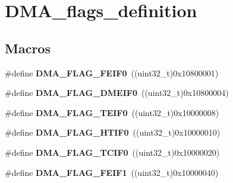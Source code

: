 \hypertarget{group___d_m_a__flags__definition}{\section{D\-M\-A\-\_\-flags\-\_\-definition}
\label{group___d_m_a__flags__definition}
}
\subsection*{Macros}
\begin{DoxyCompactItemize}
\item 
\hypertarget{group___d_m_a__flags__definition_ga4e09c71ab9d85493fba241fa90f60eff}{\#define {\bfseries D\-M\-A\-\_\-\-F\-L\-A\-G\-\_\-\-F\-E\-I\-F0}~((uint32\-\_\-t)0x10800001)}\label{group___d_m_a__flags__definition_ga4e09c71ab9d85493fba241fa90f60eff}

\item 
\hypertarget{group___d_m_a__flags__definition_gaf309e18b8d4113c51de6d23794bdaaab}{\#define {\bfseries D\-M\-A\-\_\-\-F\-L\-A\-G\-\_\-\-D\-M\-E\-I\-F0}~((uint32\-\_\-t)0x10800004)}\label{group___d_m_a__flags__definition_gaf309e18b8d4113c51de6d23794bdaaab}

\item 
\hypertarget{group___d_m_a__flags__definition_ga8a1b602ca53eca06597284af6edd4eca}{\#define {\bfseries D\-M\-A\-\_\-\-F\-L\-A\-G\-\_\-\-T\-E\-I\-F0}~((uint32\-\_\-t)0x10000008)}\label{group___d_m_a__flags__definition_ga8a1b602ca53eca06597284af6edd4eca}

\item 
\hypertarget{group___d_m_a__flags__definition_gaa76090f6351c3feb8e844460820236c6}{\#define {\bfseries D\-M\-A\-\_\-\-F\-L\-A\-G\-\_\-\-H\-T\-I\-F0}~((uint32\-\_\-t)0x10000010)}\label{group___d_m_a__flags__definition_gaa76090f6351c3feb8e844460820236c6}

\item 
\hypertarget{group___d_m_a__flags__definition_gae5220ac32b929e3ffce6d6239cc2a39c}{\#define {\bfseries D\-M\-A\-\_\-\-F\-L\-A\-G\-\_\-\-T\-C\-I\-F0}~((uint32\-\_\-t)0x10000020)}\label{group___d_m_a__flags__definition_gae5220ac32b929e3ffce6d6239cc2a39c}

\item 
\hypertarget{group___d_m_a__flags__definition_ga13a9f5ad620803b1f59c329ea291cdce}{\#define {\bfseries D\-M\-A\-\_\-\-F\-L\-A\-G\-\_\-\-F\-E\-I\-F1}~((uint32\-\_\-t)0x10000040)}\label{group___d_m_a__flags__definition_ga13a9f5ad620803b1f59c329ea291cdce}


\end{DoxyCompactItemize}
